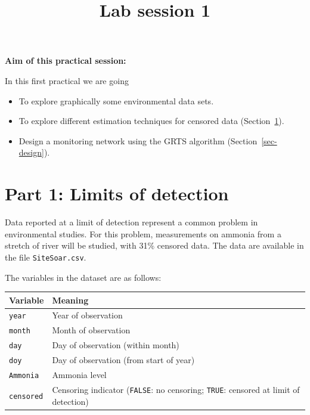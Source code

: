 \documentclass[
  letterpaper,
  DIV=11,
  numbers=noendperiod]{scrartcl}
\title{Lab session 1}
\author{}
\date{}
\makeatletter
\providecommand{\tightlist}{%
  \setlength{\itemsep}{0pt}\setlength{\parskip}{0pt}}\usepackage{longtable,booktabs,array}
\renewcommand{\maketitle}{\bgroup\setlength{\parindent}{0pt}
\begin{flushleft}
  {\color{uniblue}\sffamily\huge\textbf{\@title}} \vspace{0.3cm} \newline
  {\Large {\@subtitle}} \newline
  \@author
\end{flushleft}\egroup
}
\makeatother
\begin{document}
\maketitle

\pagestyle{mystyle}


\textbf{Aim of this practical session:}

In this first practical we are going

\begin{itemize}
\tightlist
\item
  To explore graphically some environmental data sets.
\item
  To explore different estimation techniques for censored data
  (Section~\ref{sec-LoD}).
\item
  Design a monitoring network using the GRTS algorithm
  (Section~\ref{sec-design}).
\end{itemize}

\section{Part 1: Limits of detection}\label{sec-LoD}

Data reported at a limit of detection represent a common problem in
environmental studies. For this problem, measurements on ammonia from a
stretch of river will be studied, with 31\% censored data. The data are
available in the file \texttt{SiteSoar.csv}.

The variables in the dataset are as follows:

\begin{longtable}[]{@{}
  >{\raggedright\arraybackslash}p{}
  >{\raggedright\arraybackslash}p{}@{}}
\toprule\noalign{}
\begin{minipage}[b]{\linewidth}\raggedright
Variable
\end{minipage} & \begin{minipage}[b]{\linewidth}\raggedright
Meaning
\end{minipage} \\
\midrule\noalign{}
\endhead
\bottomrule\noalign{}
\endlastfoot
\texttt{year} & Year of observation \\
\texttt{month} & Month of observation \\
\texttt{day} & Day of observation (within month) \\
\texttt{doy} & Day of observation (from start of year) \\
\texttt{Ammonia} & Ammonia level \\
\texttt{censored} & Censoring indicator (\texttt{FALSE}: no censoring;
\texttt{TRUE}: censored at limit of detection) \\
\end{longtable}
\end{document}

